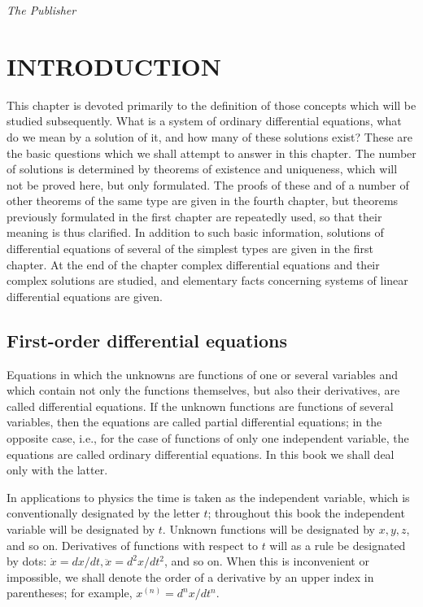 \documentclass[10pt,a5paper]{book}
\theoremstyle{plain}
\theoremstyle{definition}
\theoremstyle{remark}
\begin{document}
\vspace{2em}
\hfill \textit{The Publisher}

\tableofcontents   %


\mainmatter


\chapter{INTRODUCTION}
This chapter is devoted primarily to the definition of those concepts which will be studied subsequently. What is a system of ordinary differential equations, what do we mean by a solution of it, and how many of these solutions exist? These are the basic questions which we shall attempt to answer in this chapter. The number of solutions is determined by theorems of existence and uniqueness, which will not be proved here, but only formulated. The proofs of these and of a number of other theorems of the same type are given in the fourth chapter, but theorems previously formulated in the first chapter are repeatedly used, so that their meaning is thus clarified. In addition to such basic information, solutions of differential equations of several of the simplest types are given in the first chapter. At the end of the chapter complex differential equations and their complex solutions are studied, and elementary facts concerning systems of linear differential equations are given.

\section{First-order differential equations}
Equations in which the unknowns are functions of one or several variables and which contain not only the functions themselves, but also their derivatives, are called differential equations. If the unknown functions are functions of several variables, then the equations are called partial differential equations; in the opposite case, i.e., for the case of functions of only one independent variable, the equations are called ordinary differential equations. In this book we shall deal only with the latter.

In applications to physics the time is taken as the independent variable, which is conventionally designated by the letter $t$; throughout this book the independent variable will be designated by $t$. Unknown functions will be designated by $x, y, z$, and so on. Derivatives of functions with respect to $t$ will as a rule be designated by dots: $\dot{x}=d x / d t, \ddot{x}=d^{2} x / d t^{2}$, and so on. When this is inconvenient or impossible, we shall denote the order of a derivative by an upper index in parentheses; for example, $x^{(n)}=d^{n} x / d t^{n}$.
\end{document}
